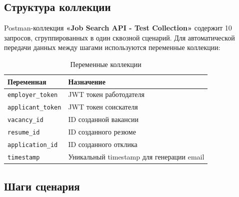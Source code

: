 ﻿\documentclass[a4paper,14pt]{extarticle}
\begin{document}
\subsection{Структура коллекции}

Postman-коллекция \textbf{«Job Search API - Test Collection»} содержит 10 запросов, сгруппированных в один сквозной сценарий. Для автоматической передачи данных между шагами используются переменные коллекции:

\begin{table}[H]
\centering
\caption{Переменные коллекции}
\begin{tabularx}{\textwidth}{lX}
\toprule
\textbf{Переменная} & \textbf{Назначение} \\
\midrule
\texttt{employer\_token}  & JWT токен работодателя \\
\texttt{applicant\_token} & JWT токен соискателя \\
\texttt{vacancy\_id}      & ID созданной вакансии \\
\texttt{resume\_id}       & ID созданного резюме \\
\texttt{application\_id}  & ID созданного отклика \\
\texttt{timestamp}        & Уникальный timestamp для генерации email \\
\bottomrule
\end{tabularx}
\end{table}

\subsection{Шаги сценария}
\end{document}
